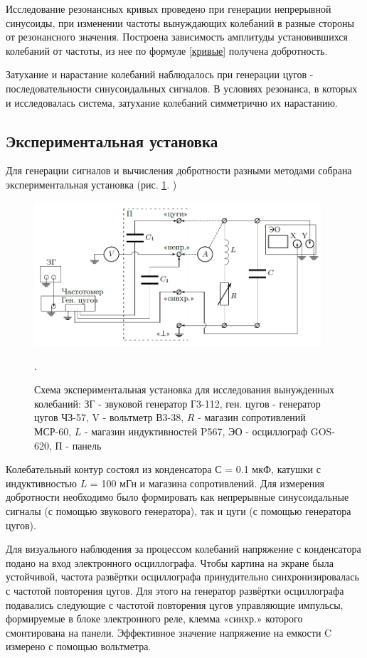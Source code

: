 \documentclass[a4paper,12pt]{article} %
\begin{document}
Исследование резонансных кривых проведено при генерации непрерывной синусоиды, при изменении частоты вынуждающих колебаний в разные стороны от резонансного значения. Построена зависимость амплитуды установившихся колебаний от частоты, из нее по формуле \ref{кривые} получена добротность.

Затухание и нарастание колебаний наблюдалось при генерации цугов - последовательности синусоидальных сигналов. В условиях резонанса, в которых и исследовалась система, затухание колебаний симметрично их нарастанию.


\subsection*{Экспериментальная установка}

Для генерации сигналов и вычисления добротности разными методами собрана экспериментальная установка (рис.  \ref{установка}. )
\begin{figure}[h!]
\begin{center}
\includegraphics[width=0.95\textwidth]{установка}
\caption{Схема экспериментальная установка для исследования вынужденных
колебаний: ЗГ - звуковой генератор Г3-112, ген. цугов - генератор цугов ЧЗ-57, V - вольтметр В3-38, $R$ - магазин сопротивлений МСР-60, $L$ - магазин индуктивностей P567, ЭО - осциллограф GOS-620, П - панель} \label{установка}.
\end{center}
\end{figure} 

Колебательный контур состоял из конденсатора $С $ = 0.1 мкФ, катушки с индуктивностью $L$ = 100 мГн и магазина сопротивлений. Для измерения добротности необходимо было формировать как непрерывные синусоидальные сигналы (с помощью звукового генератора), так и цуги (с помощью генератора цугов). 

Для визуального наблюдения за процессом колебаний напряжение с конденсатора подано на вход электронного осциллографа. Чтобы картина на экране была устойчивой, частота развёртки осциллографа принудительно синхронизировалась с частотой повторения цугов. Для этого на генератор развёртки осциллографа подавались следующие с частотой повторения цугов управляющие импульсы, формируемые в блоке электронного реле, клемма «синхр.» которого смонтирована на панели. Эффективное значение напряжение на емкости C измерено с помощью вольтметра.
\end{document}
